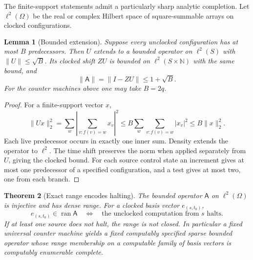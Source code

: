 \documentclass[11pt,letterpaper]{article}
\numberwithin{equation}{section}
\newtheorem{theorem}{Theorem}[section]
\newtheorem{lemma}[theorem]{Lemma}
\theoremstyle{definition}
\newcommand{\N}{\mathbb N}
\newcommand{\ran}{\operatorname{ran}}
\newcommand{\Ann}{\mathsf{A}}
\begin{document}
The finite-support statements admit a particularly sharp analytic
completion. Let $\ell^2(\Omega)$ be the real or complex Hilbert space
of square-summable arrays on clocked configurations.

\begin{lemma}[Bounded extension]\label{pwh:bt:lem:bounded}
Suppose every unclocked configuration has at most $B$ predecessors.
Then $U$ extends to a bounded operator on $\ell^2(S)$ with
$\|U\|\le\sqrt B$. Its clocked shift $ZU$ is bounded on
$\ell^2(S\times\N)$ with the same bound, and
\[
 \|\Ann\|=\|I-ZU\|\le1+\sqrt B.
\]
For the counter machines above one may take $B=2q$.
\end{lemma}
\begin{proof}
For a finite-support vector $x$,
\[
 \|Ux\|_2^2
 =\sum_w\left|\sum_{v:f(v)=w}x_v\right|^2
 \le B\sum_w\sum_{v:f(v)=w}|x_v|^2
 \le B\|x\|_2^2.
\]
Each live predecessor occurs in exactly one inner sum. Density extends
the operator to $\ell^2$. The time shift preserves the norm when
applied separately from $U$, giving the clocked bound. For each source
control state an increment gives at most one predecessor of a specified
configuration, and a test gives at most two, one from each branch.
\end{proof}

\begin{theorem}[Exact range encodes halting]\label{pwh:bt:thm:range}
The bounded operator $\Ann$ on $\ell^2(\Omega)$ is injective and has
dense range. For a clocked basis vector $e_{(s,t_0)}$,
\begin{equation}\label{pwh:bt:eq:range}
 e_{(s,t_0)}\in\ran\Ann
 \quad\Longleftrightarrow\quad
 \text{the unclocked computation from }s\text{ halts}.
\end{equation}
If at least one source does not halt, the range is not closed. In
particular a fixed universal counter machine yields a fixed computably
specified sparse bounded operator whose range membership on a
computable family of basis vectors is computably enumerable complete.
\end{theorem}
\end{document}

